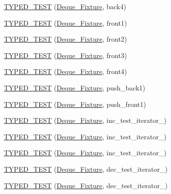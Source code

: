 \begin{DoxyCompactItemize}
\hyperlink{TestDeque_8c_09_09_aa7a66bff0e053d143931e4fcf0b728a5}{T\-Y\-P\-E\-D\-\_\-\-T\-E\-S\-T} (\hyperlink{structDeque__Fixture}{Deque\-\_\-\-Fixture}, back4)
\item 
\hyperlink{TestDeque_8c_09_09_a692ef29abc0183e414fb1cdee72e43df}{T\-Y\-P\-E\-D\-\_\-\-T\-E\-S\-T} (\hyperlink{structDeque__Fixture}{Deque\-\_\-\-Fixture}, front1)
\item 
\hyperlink{TestDeque_8c_09_09_a2ec93adeb6d3a487578c51adfd8e665d}{T\-Y\-P\-E\-D\-\_\-\-T\-E\-S\-T} (\hyperlink{structDeque__Fixture}{Deque\-\_\-\-Fixture}, front2)
\item 
\hyperlink{TestDeque_8c_09_09_aeebb95c37396f252a179ab73ba3b8158}{T\-Y\-P\-E\-D\-\_\-\-T\-E\-S\-T} (\hyperlink{structDeque__Fixture}{Deque\-\_\-\-Fixture}, front3)
\item 
\hyperlink{TestDeque_8c_09_09_a2b84053d655ab7f53dd526f3dbf16515}{T\-Y\-P\-E\-D\-\_\-\-T\-E\-S\-T} (\hyperlink{structDeque__Fixture}{Deque\-\_\-\-Fixture}, front4)
\item 
\hyperlink{TestDeque_8c_09_09_adec6c366075acae4d41a8060d36b0c24}{T\-Y\-P\-E\-D\-\_\-\-T\-E\-S\-T} (\hyperlink{structDeque__Fixture}{Deque\-\_\-\-Fixture}, push\-\_\-back1)
\item 
\hyperlink{TestDeque_8c_09_09_ae9bdb57a6cb92a5186fdb1ccdc0ddbf4}{T\-Y\-P\-E\-D\-\_\-\-T\-E\-S\-T} (\hyperlink{structDeque__Fixture}{Deque\-\_\-\-Fixture}, push\-\_\-front1)
\item 
\hyperlink{TestDeque_8c_09_09_a08ecc05f20a8b7f0409a05b2bc747c7e}{T\-Y\-P\-E\-D\-\_\-\-T\-E\-S\-T} (\hyperlink{structDeque__Fixture}{Deque\-\_\-\-Fixture}, inc\-\_\-test\-\_\-iterator\-\_)
\item 
\hyperlink{TestDeque_8c_09_09_a5c69931f40291e4cb4524688cdb5e975}{T\-Y\-P\-E\-D\-\_\-\-T\-E\-S\-T} (\hyperlink{structDeque__Fixture}{Deque\-\_\-\-Fixture}, inc\-\_\-test\-\_\-iterator\-\_)
\item 
\hyperlink{TestDeque_8c_09_09_af56b0c263cd1c83a98415d5ddea43d5f}{T\-Y\-P\-E\-D\-\_\-\-T\-E\-S\-T} (\hyperlink{structDeque__Fixture}{Deque\-\_\-\-Fixture}, inc\-\_\-test\-\_\-iterator\-\_)
\item 
\hyperlink{TestDeque_8c_09_09_a217d38c5fbc4d8b7560ba447a34d4aa6}{T\-Y\-P\-E\-D\-\_\-\-T\-E\-S\-T} (\hyperlink{structDeque__Fixture}{Deque\-\_\-\-Fixture}, dec\-\_\-test\-\_\-iterator\-\_)
\item 
\hyperlink{TestDeque_8c_09_09_aa4b42056769d5df6d3f47d51fc280ca1}{T\-Y\-P\-E\-D\-\_\-\-T\-E\-S\-T} (\hyperlink{structDeque__Fixture}{Deque\-\_\-\-Fixture}, dec\-\_\-test\-\_\-iterator\-\_)

\end{DoxyCompactItemize}
